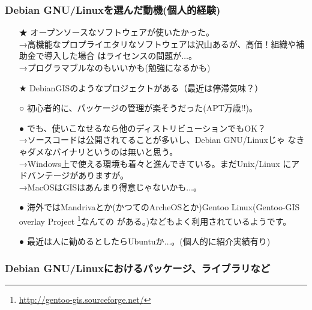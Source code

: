 \documentclass[mingoth,a4paper]{jsarticle}
\begin{document}
\subsubsection{Debian GNU/Linuxを選んだ動機(個人的経験)}
\begin{itemize}
 \item[★] オープンソースなソフトウェアが使いたかった。\\
       →高機能なプロプライエタリなソフトウェアは沢山あるが、高価！組織や補助金で導入した場合
	   はライセンスの問題が$\dots$。\\
	→プログラマブルなのもいいかも(勉強になるかも)
 \item[★] DebianGISのようなプロジェクトがある（最近は停滞気味？）
 \item[○] 初心者的に、パッケージの管理が楽そうだった(APT万歳!!)。
 \item[●] でも、使いこなせるなら他のディストリビューションでもOK？\\
	   →ソースコードは公開されてることが多いし、Debian GNU/Linuxじゃ
	   なきゃダメなバイナリというのは無いと思う。\\
	   →Windows上で使える環境も着々と進んできている。まだUnix/Linux
	   にアドバンテージがありますが。\\
	   →MacOSはGISはあんまり得意じゃないかも$\dots$。
 \item[●] 海外ではMandrivaとか(かつてのArcheOSとか)Gentoo
	   Linux(Gentoo-GIS overlay Project \footnote{\url{http://gentoo-gis.sourceforge.net/}}なんての
	   がある。)などもよく利用されているようです。
 \item[●] 最近は人に勧めるとしたらUbuntuか$\dots$。(個人的に紹介実績有り)
\end{itemize}

\subsubsection{Debian GNU/Linuxにおけるパッケージ、ライブラリなど}
\end{document}

